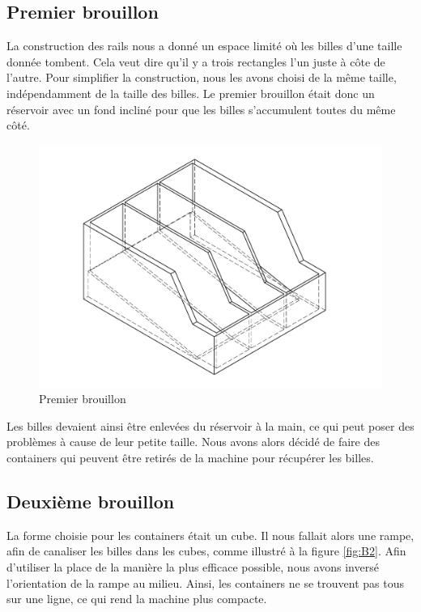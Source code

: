 \subsection{Premier brouillon}
La construction des rails nous a donné un espace limité où les billes d'une taille donnée tombent. Cela veut dire qu'il y a trois rectangles l'un juste à côte de l'autre. Pour simplifier la construction, nous les avons choisi de la même taille, indépendamment de la taille des billes. Le premier brouillon était donc un réservoir avec un fond incliné pour que les billes s'accumulent toutes du même côté.

\begin{figure}
    \centering
    \includegraphics[width=\textwidth]{Graphics/Reservoir_final/PREMIER_BROUILLON.pdf}
    \caption{Premier brouillon}
\end{figure}

Les billes devaient ainsi être enlevées du réservoir à la main, ce qui peut poser des problèmes à cause de leur petite taille. Nous avons alors décidé de faire des containers qui peuvent être retirés de la machine pour récupérer les billes. 

\subsection{Deuxième brouillon}
La forme choisie pour les containers était un cube. Il nous fallait alors une rampe, afin de canaliser les billes dans les cubes, comme illustré à la figure \ref{fig:B2}. Afin d'utiliser la place de la manière la plus efficace possible, nous avons inversé l'orientation de la rampe au milieu. Ainsi, les containers ne se trouvent pas tous sur une ligne, ce qui rend la machine plus compacte. 

